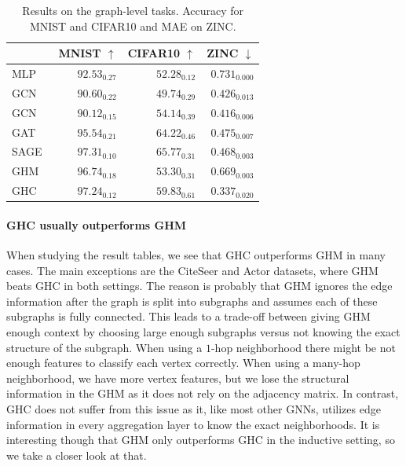 \documentclass[conference]{IEEEtran}
\begin{document}
\begin{table}
\centering
\caption{Results on the graph-level tasks. Accuracy for MNIST and CIFAR10 and MAE on ZINC.}
\label{tab:results_gra}
\begin{tabular}{l|rrr} \toprule
& MNIST $\uparrow$ & CIFAR10 $\uparrow$ & ZINC $\downarrow$   \\ \midrule
MLP & $92.53_{0.27}$ & $52.28_{0.12}$ & $0.731_{0.000}$ \\   
GCN & $90.60_{0.22}$ & $49.74_{0.29}$ & $0.426_{0.013}$ \\ 
GCN~\cite{DBLP:journals/jmlr/DwivediJL0BB23} & $90.12_{0.15}$ & $54.14_{0.39}$ & $0.416_{0.006}$ \\ 
GAT~\cite{DBLP:journals/jmlr/DwivediJL0BB23} & $95.54_{0.21}$ & $64.22_{0.46}$ & $0.475_{0.007}$  \\ 
SAGE~\cite{DBLP:journals/jmlr/DwivediJL0BB23} & $\mathbf{97.31_{0.10}}$ & $\mathbf{65.77_{0.31}}$ & $0.468_{0.003}$ \\ 
\midrule
GHM & $96.74_{0.18}$ & $53.30_{0.31}$ & $0.669_{0.003}$\\ 
GHC & $97.24_{0.12}$ & $59.83_{0.61}$ & $\mathbf{0.337_{0.020}}$ \\ \bottomrule
\end{tabular}
\end{table}

\paragraph*{GHC usually outperforms GHM}
When studying the result tables, we see that GHC outperforms GHM in many cases.
The main exceptions are the CiteSeer and Actor datasets, where GHM beats GHC in both settings.
The reason is probably that GHM ignores the edge information after the graph is split into subgraphs and assumes each of these subgraphs is fully connected.
This leads to a trade-off between giving GHM enough context by choosing large enough subgraphs versus not knowing the exact structure of the subgraph.
When using a $1$-hop neighborhood there might be not enough features to classify each vertex correctly.
When using a many-hop neighborhood, we have more vertex features, but we lose the structural information in the GHM as it does not rely on the adjacency matrix.
In contrast, GHC does not suffer from this issue as it, like most other GNNs, utilizes edge information in every aggregation layer to know the exact neighborhoods. 
It is interesting though that GHM only outperforms GHC in the inductive setting, so we take a closer look at that.
\end{document}
